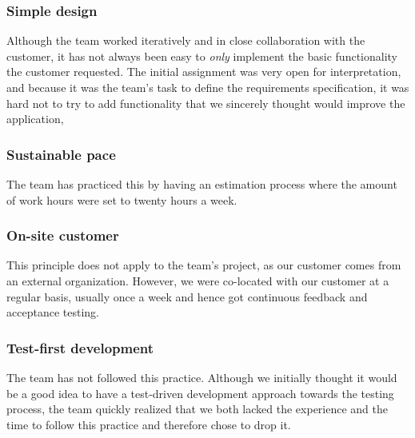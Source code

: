\subsubsection{Simple design}
Although the team worked iteratively and in close collaboration with the customer, it has not always been easy to \emph{only} implement the basic functionality the customer requested. The initial assignment was very open for interpretation, and because it was the team's task to define the requirements specification, it was hard not to try to add functionality that we sincerely thought would improve the application, 

\subsubsection{Sustainable pace}
The team has practiced this by having an estimation process where the amount of work hours were set to twenty hours a week.

\subsubsection{On-site customer}
This principle does not apply to the team's project, as our customer comes from an external organization. However, we were co-located with our customer at a regular basis, usually once a week and hence got continuous feedback and acceptance testing.

\subsubsection{Test-first development}
The team has not followed this practice. Although we initially thought it would be a good idea to have a test-driven development approach towards the testing process, the team quickly realized that we both lacked the experience and the time to follow this practice and therefore chose to drop it.

